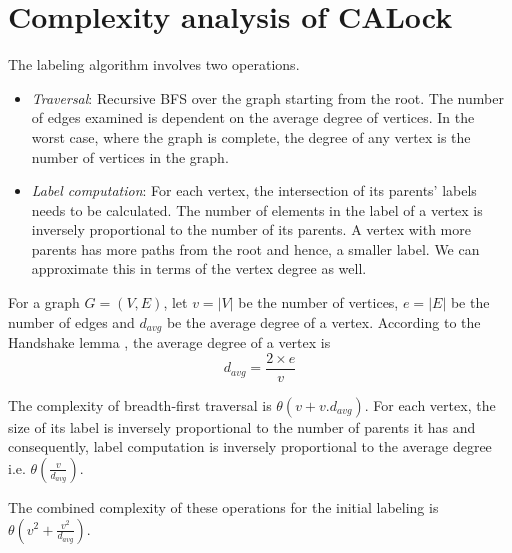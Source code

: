 \section{Complexity analysis of CALock} \label{complexityAnalysis}

The labeling algorithm involves two operations.
\begin{itemize}
	\item \emph{Traversal}: Recursive BFS over the graph starting from the root. The number of edges examined is dependent on the average degree of vertices. In the worst case, where the graph is complete, the degree of any vertex is the number of vertices in the graph.
	\item \emph{Label computation}: For each vertex, the intersection of its parents' labels needs to be calculated. The number of elements in the label of a vertex is inversely proportional to the number of its parents. A vertex with more parents has more paths from the root and hence, a smaller label. We can approximate this in terms of the vertex degree as well. 
\end{itemize}

For a graph $G = (V, E)$, let $v = \lvert V \rvert$ be the number of vertices, $e = \lvert E \rvert$ be the number of edges and $d_{avg}$ be the average degree of a vertex. According to the Handshake lemma \cite{euler1741solutio}, the average degree of a vertex is 
\begin{equation}
	d_{avg} = \frac{2 \times e}{v} 
\end{equation}


The complexity of breadth-first traversal is $\theta(v + v.d_{avg})$. 
For each vertex, the size of its label is inversely proportional to the number of parents it has and consequently, label computation is inversely proportional to the average degree i.e. $\theta(\frac{v}{d_{avg}})$. 

The combined complexity of these operations for the initial labeling is $\theta(v^2+ \frac{v^2}{d_{avg}})$.

